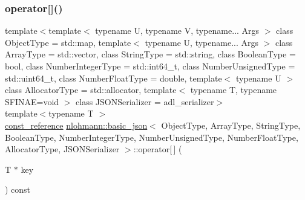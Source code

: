 \mbox{\label{classnlohmann_1_1basic__json_a26554213cbb1722accc460ce348c860a}} 
\subsubsection{\texorpdfstring{operator[]()}{operator[]()}\hspace{0.1cm}{\footnotesize\ttfamily [8/10]}}
{\footnotesize\ttfamily template$<$template$<$ typename U, typename V, typename... Args $>$ class Object\+Type = std\+::map, template$<$ typename U, typename... Args $>$ class Array\+Type = std\+::vector, class String\+Type  = std\+::string, class Boolean\+Type  = bool, class Number\+Integer\+Type  = std\+::int64\+\_\+t, class Number\+Unsigned\+Type  = std\+::uint64\+\_\+t, class Number\+Float\+Type  = double, template$<$ typename U $>$ class Allocator\+Type = std\+::allocator, template$<$ typename T, typename S\+F\+I\+N\+A\+E=void $>$ class J\+S\+O\+N\+Serializer = adl\+\_\+serializer$>$ \\
template$<$typename T $>$ \\
\mbox{\hyperlink{classnlohmann_1_1basic__json_a4057c5425f4faacfe39a8046871786ca}{const\+\_\+reference}} \mbox{\hyperlink{classnlohmann_1_1basic__json}{nlohmann\+::basic\+\_\+json}}$<$ Object\+Type, Array\+Type, String\+Type, Boolean\+Type, Number\+Integer\+Type, Number\+Unsigned\+Type, Number\+Float\+Type, Allocator\+Type, J\+S\+O\+N\+Serializer $>$\+::operator\mbox{[}$\,$\mbox{]} (\begin{DoxyParamCaption}\item[{T $\ast$}]{key }\end{DoxyParamCaption}) const\hspace{0.3cm}{\ttfamily [inline]}}




